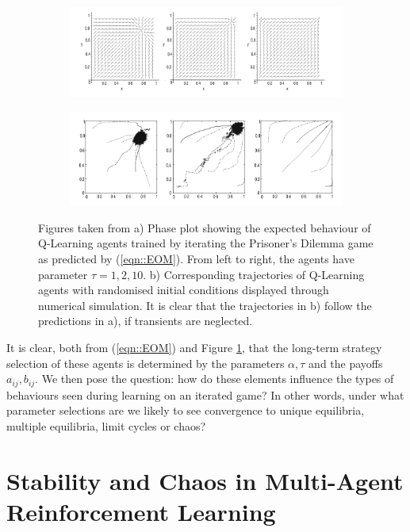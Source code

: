 \documentclass[letterpaper]{article} %
\begin{document}
    \begin{figure}
    \centering
        \begin{subfigure}[b]{0.9 \textwidth}
            \includegraphics[width=0.52 \textwidth]{Figures/Dynamics}
            \caption{}
        \end{subfigure}
        
        \begin{subfigure}[b]{0.9 \textwidth}
            \includegraphics[width=0.5 \textwidth]{Figures/Q-Learners}
            \caption{}
        \end{subfigure}

        \caption{ \label{fig::TuylsExperiments} Figures taken from \cite{Tuyls2006AnGames} a) Phase
        plot showing the expected behaviour of Q-Learning agents trained by iterating the
        Prisoner's Dilemma game as predicted by (\ref{eqn::EOM}). From left to right, the agents
        have parameter $\tau = 1, 2, 10$. b) Corresponding trajectories of Q-Learning agents with
        randomised initial conditions displayed through numerical simulation. It is clear that the
        trajectories in b) follow the predictions in a), if transients are neglected. }
    \end{figure}    

    It is clear, both from (\ref{eqn::EOM}) and Figure \ref{fig::TuylsExperiments}, that the long-term strategy selection of
    these agents is determined by the parameters $\alpha, \tau$ and the payoffs $a_{ij}, b_{ij}$. We
    then pose the question: how do these elements influence the types of behaviours seen during
    learning on an iterated game? In other words, under what parameter selections are we likely to
    see convergence to unique equilibria, multiple equilibria, limit cycles or chaos? 

\section{Stability and Chaos in Multi-Agent Reinforcement Learning}
\end{document}
